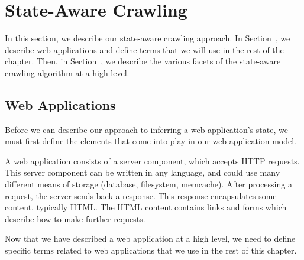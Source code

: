 \section{State-Aware Crawling}

In this section, we describe our state-aware crawling approach. In
Section~, we describe web applications and define terms that we
will use in the rest of the chapter. Then, in Section~, we
describe the various facets of the state-aware crawling algorithm at a high
level.

\subsection{Web Applications}

Before we can describe our approach to inferring a web application's state, we
must first define the elements that come into play in our web application model.

A web application consists of a server component, which accepts HTTP requests.
This server component can be written in any language, and could use many
different means of storage (database, filesystem, memcache). After
processing a request, the server sends back a response. This response
encapsulates some content, typically HTML. The HTML content contains links and
forms which describe how to make further requests. 

Now that we have described a web application at a high level, we need to define
specific terms related to web applications that we use in the rest of this chapter.

